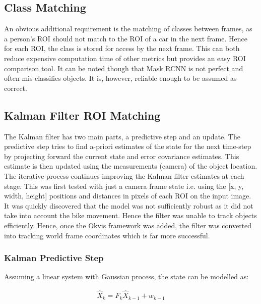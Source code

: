 \documentclass[a4paper,11pt,notitlepage]{article}
\begin{document}
\subsection{Class Matching} \label{class_matching}
An obvious additional requirement is the matching of classes between frames, as a person's ROI should not match to the ROI of a car in the next frame. Hence for each ROI, the class is stored for access by the next frame. This can both reduce expensive computation time of other metrics but provides an easy ROI comparison tool. It can be noted though that Mask RCNN is not perfect and often mis-classifies objects. It is, however, reliable enough to be assumed as correct.

\subsection{Kalman Filter ROI Matching} \label{kalman_matching}

The Kalman filter has two main parts, a predictive step and an update. The predictive step tries to find a-priori estimates of the state for the next time-step by projecting forward the current state and error covariance estimates. This estimate is then updated using the measurements (camera) of the object location. The iterative process continues improving the Kalman filter estimates at each stage. 
\newline \newline
This was first tested with just a camera frame state i.e. using the [x, y, width, height] positions and distances in pixels of each ROI on the input image. It was quickly discovered that the model was not sufficiently robust as it did not take into account the bike movement. Hence the filter was unable to track objects efficiently. Hence, once the Okvis framework was added, the filter was converted into tracking world frame coordinates which is far more successful.

\subsubsection{Kalman Predictive Step}
Assuming a linear system with Gaussian process, the state can be modelled as:

\begin{equation}
\begin{aligned}
\hat{X}_{k} =  F_{k} \hat{X}_{k-1} + w_{k-1}
\end{aligned}
\end{equation}
\end{document}
